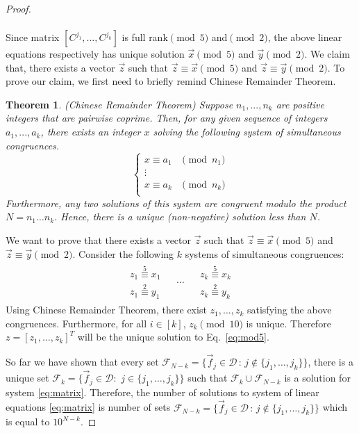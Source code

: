 \documentclass{article}
\newtheorem{theorem}{Theorem}
\newcommand{\transp}[1]{#1^T}
\begin{document}
\begin{proof}
\begin{equation}
\begin{array}{l}
 
 \end{array} 
  \end{equation}
 
Since matrix $[C^{j_1},\ldots,C^{j_k}]$ is full rank$\pmod{5}$ and$\pmod{2}$, the above linear equations respectively has unique solution $\vec{x}\pmod{5}$ and $\vec{y}\pmod{2}$. We claim that, there exists a vector $\vec{z}$ such that $\vec{z}\equiv\vec{x}\pmod{5}$ and $\vec{z}\equiv\vec{y}\pmod{2}$. To prove our claim, we first need to briefly remind Chinese Remainder Theorem.

\begin{theorem}(Chinese Remainder Theorem)
\label{chinese}
Suppose $n_1, ..., n_k$ are positive integers that are pairwise coprime. Then, for any given sequence of integers $a_1, ..., a_k$, there exists an integer $x$ solving the following system of simultaneous congruences.
$$
\left\{ \begin{array}{cl}
     x \equiv a_1 &\pmod{n_1} \\
      \vdots &\\
      x \equiv a_k &\pmod{n_k} \\
\end{array} \right.		
$$
Furthermore, any two solutions of this system are congruent modulo the product $N = n_1 \ldots n_k$. Hence, there is a unique (non-negative) solution less than $N$.
\end{theorem}

We want to prove that there exists a vector $\vec{z}$ such that $\vec{z}\equiv\vec{x}\pmod{5}$ and $\vec{z}\equiv\vec{y}\pmod{2}$. Consider the following $k$ systems of simultaneous congruences:
$$
\begin{array}{lcr}
\begin{array}{l}
{z}_1\overset{5}{\equiv} {x}_1\\
{z}_1\overset{2}{\equiv} {y}_1
\end{array} &
\begin{array}{c}
\ldots
\end{array}&
\begin{array}{r}
{z}_k\overset{5}{\equiv} {x}_k\\
{z}_k\overset{2}{\equiv} {y}_k
\end{array}
	
\end{array}
$$
Using Chinese Remainder Theorem, there exist ${z}_1,\ldots,{z}_k$ satisfying the above congruences. Furthermore, for all $i\in[k]$, ${z}_k\pmod{10}$ is unique. Therefore $z=[z_1,\ldots,z_k]\transp{}$ will be the unique solution to Eq.~\ref{eq:mod5}. 


So far we have shown that every set $\mathcal{F}_{N-k}=\{\vec{f}_j\in\mathcal{D}\, : \, j \notin \{j_1,\ldots,j_k\} \}$, there is a unique set $\mathcal{F}_k=\{\vec{f}_j\in\mathcal{D}:\,\, j\in\{j_1,\ldots,j_k\}\}$ such that $\mathcal{F}_k \cup\mathcal{F}_{N-k}$ is a solution for system \ref{eq:matrix}. Therefore, the number of solutions to system of linear equations \ref{eq:matrix} is number of sets $\mathcal{F}_{N-k}=\{\vec{f}_j\in\mathcal{D}\, : \, j \notin \{j_1,\ldots,j_k\} \}$ which is equal to $10^{N-k}$.
\end{proof}
\end{document}
